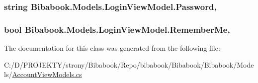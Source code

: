 \subsubsection[{Password}]{\setlength{\rightskip}{0pt plus 5cm}string Bibabook.\+Models.\+Login\+View\+Model.\+Password\hspace{0.3cm}{\ttfamily [get]}, {\ttfamily [set]}}\label{class_bibabook_1_1_models_1_1_login_view_model_a4765ab85b0f683bade994ada8dabc686}
\hypertarget{class_bibabook_1_1_models_1_1_login_view_model_a0e14eda3d537967dce751035608898a6}{}
\subsubsection[{Remember\+Me}]{\setlength{\rightskip}{0pt plus 5cm}bool Bibabook.\+Models.\+Login\+View\+Model.\+Remember\+Me\hspace{0.3cm}{\ttfamily [get]}, {\ttfamily [set]}}\label{class_bibabook_1_1_models_1_1_login_view_model_a0e14eda3d537967dce751035608898a6}


The documentation for this class was generated from the following file\+:\begin{DoxyCompactItemize}
\item 
C\+:/\+D/\+P\+R\+O\+J\+E\+K\+T\+Y/strony/\+Bibabook/\+Repo/bibabook/\+Bibabook/\+Bibabook/\+Models/\hyperlink{_account_view_models_8cs}{Account\+View\+Models.\+cs}\end{DoxyCompactItemize}
